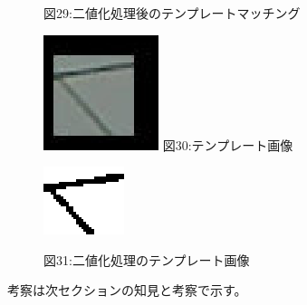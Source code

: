 ﻿\documentclass[a4j,11pt]{jarticle}
\begin{document}
\begin{figure}[tb]
\begin{minipage}{0.49\hsize}
  図29:二値化処理後のテンプレートマッチング
 \end{minipage}

 \begin{minipage}{0.49\hsize} %
   \center
   \includegraphics[width=\hsize]{./eps/template-04.eps}
   図30:テンプレート画像
 \end{minipage}
 \begin{minipage}{0.49\hsize} %
   \center
   \includegraphics[width=\hsize]{./eps/binarytemplate.eps}

  図31:二値化処理のテンプレート画像
 \end{minipage}

\end{figure}
考察は次セクションの知見と考察で示す。
\end{document}
